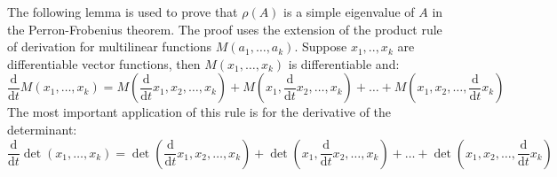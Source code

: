 \documentclass[a4paper,11pt]{report}
\begin{document}
   The following lemma is used to prove that $\rho(A)$ is a simple 
   eigenvalue of $A$ in the Perron-Frobenius theorem. The proof uses the 
   extension of the product rule of derivation for multilinear functions 
   $M(a_1,\ldots,a_k)$. Suppose $x_1,..,x_k$ are differentiable vector functions, 
   then $M(x_1,\ldots,x_k)$ is differentiable and:
   $$\frac{\mathrm{d}}{\mathrm{d}t}M(x_1,\ldots, x_k) = M(\frac{\mathrm{d}}{\mathrm{d}t} x_1, x_2, \ldots, x_k) 
   + M(x_1, \frac{\mathrm{d}}{\mathrm{d}t} x_2, \ldots, x_k) + \ldots +  M(x_1,  x_2, \ldots,\frac{\mathrm{d}}{\mathrm{d}t} x_k) $$
   The most important application of this rule is for the derivative of the determinant:
   $$\frac{\mathrm{d}}{\mathrm{d}t}\det(x_1,\ldots, x_k) = \det(\frac{\mathrm{d}}{\mathrm{d}t} x_1, x_2, \ldots, x_k) 
   + \det(x_1, \frac{\mathrm{d}}{\mathrm{d}t} x_2, \ldots, x_k) + \ldots + \det(x_1,  x_2, \ldots,\frac{\mathrm{d}}{\mathrm{d}t} x_k) $$
\end{document}
